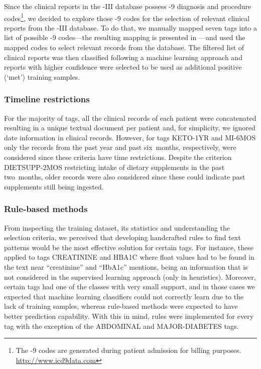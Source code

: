 Since the clinical reports in the -III database possess -9 diagnosis and procedure codes\footnote{The -9 codes are generated during patient admission for billing purposes. \url{http://www.icd9data.com}}, we decided to explore those -9 codes for the selection of relevant clinical reports from the -III database.
To do that, we manually mapped seven tags into a list of possible -9 codes---the resulting mapping is presented in ---and used the mapped codes to select relevant records from the database.
The filtered list of clinical reports was then classified following a machine learning approach and reports with higher confidence were selected to be used as additional positive (`met') training samples.


\subsubsection{Timeline restrictions}

For the majority of tags, all the clinical records of each patient were concatenated resulting in a unique textual document per patient and, for simplicity, we ignored date information in clinical records.
However, for tags \textsf{KETO-1YR} and \textsf{MI-6MOS} only the records from the past year and past six~months, respectively, were considered since these criteria have time restrictions.
Despite the criterion \textsf{DIETSUPP-2MOS} restricting intake of dietary supplements in the past two~months, older records were also considered since these could indicate past supplements still being ingested.




\subsubsection{Rule-based methods}

From inspecting the training dataset, its statistics and understanding the selection criteria, we perceived that developing handcrafted rules to find text patterns would be the most effective solution for certain tags.
For instance, these applied to tags \textsf{CREATININE} and \textsf{HBA1C} where float values had to be found in the text near ``creatinine'' and ``HbA1c'' mentions, being an information that is not considered in the supervised learning approach (only in heuristics).
Moreover, certain tags had one of the classes with very small support, and in those cases we expected that machine learning classifiers could not correctly learn due to the lack of training samples, whereas rule-based methods were expected to have better prediction capability.
With this in mind, rules were implemented for every tag with the exception of the \textsf{ABDOMINAL} and \textsf{MAJOR-DIABETES} tags.


